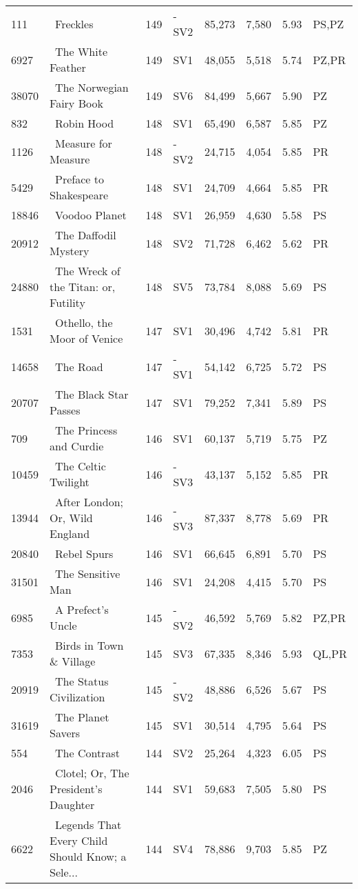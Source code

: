 \begin{longtable}{l | l | l | l | l | l | l | l}
111 & ~Freckles & 149 & -SV2 & 85,273 & 7,580 & 5.93 & PS,PZ\\
6927 & ~The White Feather & 149 & SV1 & 48,055 & 5,518 & 5.74 & PZ,PR\\
38070 & ~The Norwegian Fairy Book & 149 & SV6 & 84,499 & 5,667 & 5.90 & PZ\\
832 & ~Robin Hood & 148 & SV1 & 65,490 & 6,587 & 5.85 & PZ\\
1126 & ~Measure for Measure & 148 & -SV2 & 24,715 & 4,054 & 5.85 & PR\\
5429 & ~Preface to Shakespeare & 148 & SV1 & 24,709 & 4,664 & 5.85 & PR\\
18846 & ~Voodoo Planet & 148 & SV1 & 26,959 & 4,630 & 5.58 & PS\\
20912 & ~The Daffodil Mystery & 148 & SV2 & 71,728 & 6,462 & 5.62 & PR\\
24880 & ~The Wreck of the Titan: or, Futility & 148 & SV5 & 73,784 & 8,088 & 5.69 & PS\\
1531 & ~Othello, the Moor of Venice & 147 & SV1 & 30,496 & 4,742 & 5.81 & PR\\
14658 & ~The Road & 147 & -SV1 & 54,142 & 6,725 & 5.72 & PS\\
20707 & ~The Black Star Passes & 147 & SV1 & 79,252 & 7,341 & 5.89 & PS\\
709 & ~The Princess and Curdie & 146 & SV1 & 60,137 & 5,719 & 5.75 & PZ\\
10459 & ~The Celtic Twilight & 146 & -SV3 & 43,137 & 5,152 & 5.85 & PR\\
13944 & ~After London; Or, Wild England & 146 & -SV3 & 87,337 & 8,778 & 5.69 & PR\\
20840 & ~Rebel Spurs & 146 & SV1 & 66,645 & 6,891 & 5.70 & PS\\
31501 & ~The Sensitive Man & 146 & SV1 & 24,208 & 4,415 & 5.70 & PS\\
6985 & ~A Prefect's Uncle & 145 & -SV2 & 46,592 & 5,769 & 5.82 & PZ,PR\\
7353 & ~Birds in Town \& Village & 145 & SV3 & 67,335 & 8,346 & 5.93 & QL,PR\\
20919 & ~The Status Civilization & 145 & -SV2 & 48,886 & 6,526 & 5.67 & PS\\
31619 & ~The Planet Savers & 145 & SV1 & 30,514 & 4,795 & 5.64 & PS\\
554 & ~The Contrast & 144 & SV2 & 25,264 & 4,323 & 6.05 & PS\\
2046 & ~Clotel; Or, The President's Daughter & 144 & SV1 & 59,683 & 7,505 & 5.80 & PS\\
6622 & ~Legends That Every Child Should Know; a Sele... & 144 & SV4 & 78,886 & 9,703 & 5.85 & PZ\\

\end{longtable}
